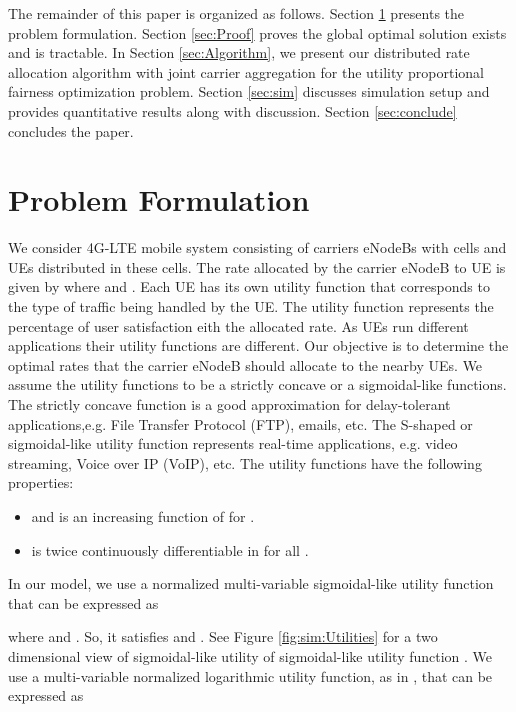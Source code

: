 \documentclass[conference]{IEEEtran}
\begin{document}
The remainder of this paper is organized as follows. Section \ref{sec:Problem_formulation} presents the problem formulation. Section \ref{sec:Proof} proves the global optimal solution exists and is tractable. In Section \ref{sec:Algorithm}, we present our distributed rate allocation algorithm with joint carrier aggregation for the utility proportional fairness optimization problem. Section \ref{sec:sim} discusses simulation setup and provides quantitative results along with discussion. Section \ref{sec:conclude} concludes the paper.


\section{Problem Formulation}\label{sec:Problem_formulation}

We consider 4G-LTE mobile system consisting of  carriers eNodeBs with  cells and  UEs distributed in these cells. The rate allocated by the  carrier eNodeB to  UE is given by  where  and . Each UE has its own utility function  that corresponds to the type of traffic being handled by the  UE. The utility function represents the percentage of user satisfaction eith the allocated rate. As UEs run different applications their utility functions are different. Our objective is to determine the optimal rates that the  carrier eNodeB should allocate to the nearby UEs. We assume the utility functions  to be a strictly concave or a sigmoidal-like functions. The strictly concave function is a good approximation for delay-tolerant applications,e.g. File Transfer Protocol (FTP), emails, etc. The S-shaped or sigmoidal-like utility function represents real-time 
applications, e.g. video streaming, Voice over IP (VoIP), etc. The utility functions have the following properties: 

\begin{itemize}
\item  and  is an increasing function of  for .
\item  is twice continuously differentiable in  for all .
\end{itemize}
In our model, we use a normalized multi-variable sigmoidal-like utility function that can be expressed as 

where  and . So, it satisfies  and . See Figure \ref{fig:sim:Utilities} for a two dimensional view of sigmoidal-like utility of sigmoidal-like utility function . We use a multi-variable normalized logarithmic utility function, as in \cite{UtilityFairness}, that can be expressed as 
\end{document}
